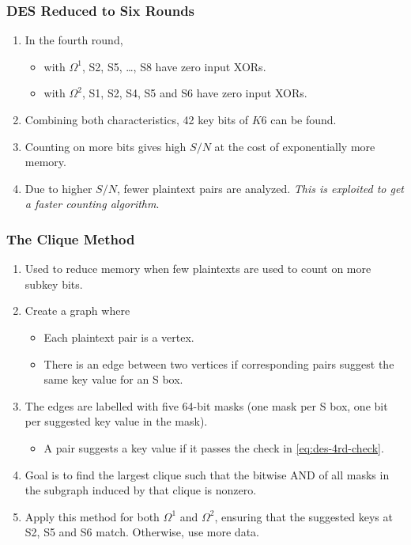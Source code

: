 \documentclass{beamer}
\begin{document}
    \begin{frame}
        \frametitle{DES Reduced to Six Rounds}
        \begin{enumerate}
            \item<1-> In the fourth round,
            \begin{itemize}
                \item with \(\Omega^1\), S2, S5, \dots, S8 have zero input XORs.
                \item with \(\Omega^2\), S1, S2, S4, S5 and S6 have zero input
                XORs.
            \end{itemize}
            \item<2-> Combining both characteristics, 42 key bits of \(K6\) can
            be found.
            \item<3-> Counting on more bits gives high \(S/N\) at the cost of
            exponentially more memory.
            \item<4-> Due to higher \(S/N\), fewer plaintext pairs are analyzed.
            \emph{This is exploited to get a faster counting algorithm}.
        \end{enumerate}
    \end{frame}

    \begin{frame}
        \frametitle{The Clique Method}
        \begin{enumerate}
            \item<1-> Used to reduce memory when few plaintexts are used to
            count on more subkey bits.
            \item<2-> Create a graph where
            \begin{itemize}
                \item Each plaintext pair is a vertex.
                \item There is an edge between two vertices if corresponding
                pairs suggest the same key value for an S box.
            \end{itemize}
            \item<3-> The edges are labelled with five 64-bit masks (one mask
            per S box, one bit per suggested key value in the mask).
            \begin{itemize}
                \item A pair suggests a key value if it passes the check in
                \eqref{eq:des-4rd-check}.
            \end{itemize}
            \item<4-> Goal is to find the largest clique such that the bitwise
            AND of all masks in the subgraph induced by that clique is nonzero.
            \item<5-> Apply this method for both \(\Omega^1\) and \(\Omega^2\),
            ensuring that the suggested keys at S2, S5 and S6 match. Otherwise,
            use more data.
        \end{enumerate}
    \end{frame}
\end{document}
